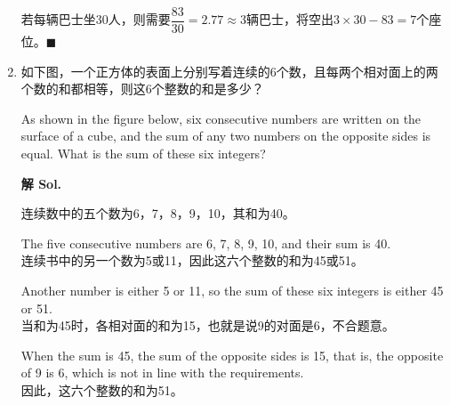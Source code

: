 \documentclass{ctexart}
\begin{document}
\begin{enumerate}
\begin{multicols}{2}
              若每辆巴士坐30人，则需要$\dfrac{83}{30} = 2.77 \approx 3$辆巴士，将空出$3 \times 30 - 83 = 7$个座位。\hfill $\blacksquare$
          \end{multicols}

    \item 如下图，一个正方体的表面上分别写着连续的6个数，且每两个相对面上的两个数的和都相等，则这6个整数的和是多少？

          As shown in the figure below, six consecutive numbers are written on the
          surface of a cube, and the sum of any two numbers on the opposite sides is
          equal. What is the sum of these six integers?\\

          \begin{center}
          \end{center}

          \textbf{解 Sol.}

          连续数中的五个数为6，7，8，9，10，其和为40。

          The five consecutive numbers are 6, 7, 8, 9, 10, and their sum is 40.\\

          连续书中的另一个数为5或11，因此这六个整数的和为45或51。

          Another number is either 5 or 11, so the sum of these six integers is either 45
          or 51.\\

          当和为45时，各相对面的和为15，也就是说9的对面是6，不合题意。

          When the sum is 45, the sum of the opposite sides is 15, that is, the opposite
          of 9 is 6, which is not in line with the requirements.\\

          因此，这六个整数的和为51。


\end{enumerate}
\end{document}
